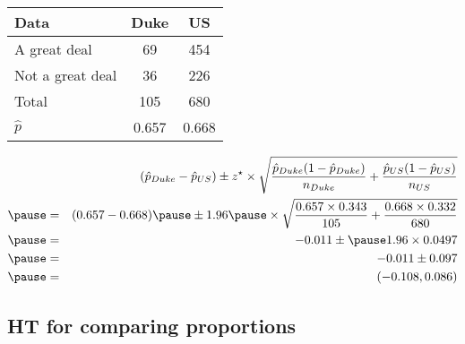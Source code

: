 \documentclass[slidestop,compress,mathserif]{beamer}
\newcommand{\soln}[1]{\textit{#1}}
\begin{document}
\begin{frame}
\frametitle{}


{\footnotesize
\begin{center}
\begin{tabular}{l | c c}
Data			& Duke		& US \\
\hline
A great deal	& 69			& 454 \\
Not a great deal& 36			& 226 \\
\hline
Total			& 105		& 680 \\
\hline
\pause
$\hat{p}$		& 0.657		& 0.668
\end{tabular}
\end{center}
}

\pause

\soln{
\begin{eqnarray*}
&& (\hat{p}_{Duke} - \hat{p}_{US}) \pm z^\star \times \sqrt{ \frac{ \hat{p}_{Duke} (1 - \hat{p}_{Duke})}{n_{Duke} } + \frac{ \hat{p}_{US} (1 -  \hat{p}_{US})}{n_{US} } }  \\
\pause
&=& (0.657 - 0.668) \pause \pm 1.96 \pause \times \sqrt{ \frac{0.657 \times 0.343}{105} + \frac{0.668 \times 0.332}{680} } \\
\pause
&=& -0.011 \pm \pause 1.96 \times 0.0497 \\
\pause
&=& -0.011 \pm 0.097 \\
\pause
&=& (-0.108, 0.086)
\end{eqnarray*}
}


\end{frame}


\subsection{HT for comparing proportions}

\end{document}
